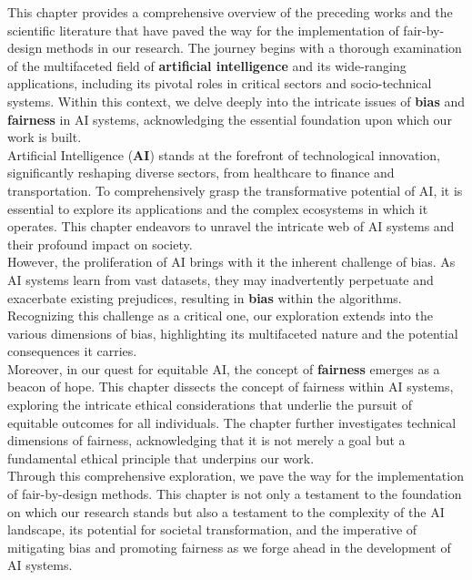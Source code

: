 \documentclass[12pt,a4paper,openright,twoside]{book}
\begin{document}
This chapter provides a comprehensive overview of the preceding works and the scientific literature that have paved the way for the implementation of fair-by-design methods in our research. The journey begins with a thorough examination of the multifaceted field of \textbf{artificial intelligence} and its wide-ranging applications, including its pivotal roles in critical sectors and socio-technical systems. Within this context, we delve deeply into the intricate issues of \textbf{bias} and \textbf{fairness} in AI systems, acknowledging the essential foundation upon which our work is built. \\
Artificial Intelligence (\textbf{AI}) stands at the forefront of technological innovation, significantly reshaping diverse sectors, from healthcare to finance and transportation. To comprehensively grasp the transformative potential of AI, it is essential to explore its applications and the complex ecosystems in which it operates. This chapter endeavors to unravel the intricate web of AI systems and their profound impact on society. \\
However, the proliferation of AI brings with it the inherent challenge of bias. As AI systems learn from vast datasets, they may inadvertently perpetuate and exacerbate existing prejudices, resulting in \textbf{bias} within the algorithms. Recognizing this challenge as a critical one, our exploration extends into the various dimensions of bias, highlighting its multifaceted nature and the potential consequences it carries. \\
Moreover, in our quest for equitable AI, the concept of \textbf{fairness} emerges as a beacon of hope. This chapter dissects the concept of fairness within AI systems, exploring the intricate ethical considerations that underlie the pursuit of equitable outcomes for all individuals. The chapter further investigates technical dimensions of fairness, acknowledging that it is not merely a goal but a fundamental ethical principle that underpins our work. \\
Through this comprehensive exploration, we pave the way for the implementation of fair-by-design methods. This chapter is not only a testament to the foundation on which our research stands but also a testament to the complexity of the AI landscape, its potential for societal transformation, and the imperative of mitigating bias and promoting fairness as we forge ahead in the development of AI systems. \\
\end{document}
